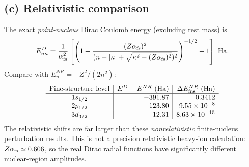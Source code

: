 \subsection*{(c) Relativistic comparison}
The exact \emph{point-nucleus} Dirac Coulomb
energy (excluding rest mass) is
\[
E_{n\kappa}^{D}=\frac1{\alpha_{\rm fs}^2}
\left[
\left(1+\frac{(Z\alpha_{\rm fs})^2}
{(n-|\kappa|+\sqrt{\kappa^2-(Z\alpha_{\rm fs})^2})^2}
\right)^{-1/2}-1\right]\ {\rm Ha}.
\]
Compare with \(E_n^{NR}=-Z^2/(2n^2)\):
\[
\begin{array}{c|r|r}
\text{Fine-structure level}&
E^{D}-E^{NR}\ (\mathrm{Ha})&
\Delta E_{\rm fns}^{NR}\ (\mathrm{Ha})\\\hline
1s_{1/2}&-391.87&0.3412\\
2p_{1/2}&-123.80&9.55\times10^{-8}\\
3d_{3/2}&-12.31&8.63\times10^{-15}
\end{array}
\]
The relativistic shifts are far larger than
these \emph{nonrelativistic} finite-nucleus
perturbation results. This is not a precision
relativistic heavy-ion calculation:
\(Z\alpha_{\rm fs}\simeq0.606\), so the real
Dirac radial functions have significantly
different nuclear-region amplitudes.
